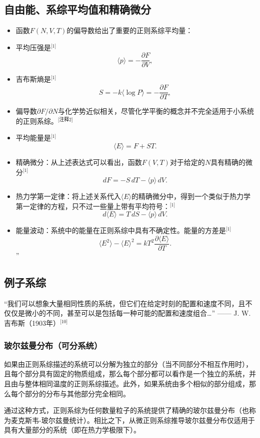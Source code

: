 \subsection{自由能、系综平均值和精确微分}  
\begin{itemize}
\item 函数\( F(N, V, T) \)的偏导数给出了重要的正则系综平均量：  
\item 平均压强是\(^\text{[1]}\)  
\[
\langle p \rangle = -\frac{\partial F}{\partial V},~
\]  
\item 吉布斯熵是\(^\text{[1]}\)  
\[
S = -k \langle \log P \rangle = -\frac{\partial F}{\partial T},~
\]  
\item 偏导数\(\partial F/\partial N\)与化学势近似相关，尽管化学平衡的概念并不完全适用于小系统的正则系综。\(^\text{[注释2]}\)  
\item 平均能量是\(^\text{[1]}\)  
\[
\langle E \rangle = F + S T.~
\]  
\item 精确微分：从上述表达式可以看出，函数\( F(V, T) \)对于给定的\( N \)具有精确的微分\(^\text{[1]}\)  
\[
dF = -S \, dT - \langle p \rangle \, dV.~
\]  
\item 热力学第一定律：将上述关系代入\( \langle E \rangle \)的精确微分中，得到一个类似于热力学第一定律的方程，只不过一些量上带有平均符号：\(^\text{[1]}\)  
\[
d \langle E \rangle = T \, dS - \langle p \rangle \, dV.~
\]  
\item 能量波动：系统中的能量在正则系综中具有不确定性。能量的方差是\(^\text{[1]}\)  
\[
\langle E^2 \rangle - \langle E \rangle^2 = k T^2 \frac{\partial \langle E \rangle}{\partial T}.~
\]”
\end{itemize}
\subsection{例子系综}  
“我们可以想象大量相同性质的系统，但它们在给定时刻的配置和速度不同，且不仅仅是微小的不同，甚至可以是包括每一种可能的配置和速度组合…” —— J. W. 吉布斯（1903年）\(^\text{[10]}\) 
\subsubsection{玻尔兹曼分布（可分系统）}  
如果由正则系综描述的系统可以分解为独立的部分（当不同部分不相互作用时），且每个部分具有固定的物质组成，那么每个部分都可以看作是一个独立的系统，并且由与整体相同温度的正则系综描述。此外，如果系统由多个相似的部分组成，那么每个部分的分布与其他部分完全相同。

通过这种方式，正则系综为任何数量粒子的系统提供了精确的玻尔兹曼分布（也称为麦克斯韦-玻尔兹曼统计）。相比之下，从微正则系综推导玻尔兹曼分布仅适用于具有大量部分的系统（即在热力学极限下）。

